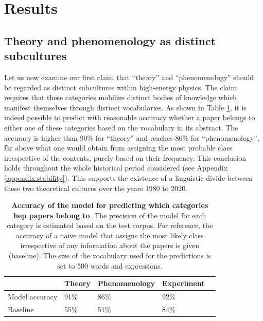 \documentclass[smallextended]{svjour3}
\begin{document}
\section{Results}
\label{section:application}

\subsection{Theory and phenomenology as distinct subcultures}\label{section:application_subcultures}

Let us now examine our first claim that ``theory'' and ``phenomenology''  should be regarded as distinct subcultures within high-energy physics. The claim requires that these categories mobilize distinct bodies of knowledge which manifest themselves through distinct vocabularies. As shown in Table \ref{table:categories_bow_prediction}, it is indeed possible to predict with reasonable accuracy whether a paper belongs to either one of these categories based on the vocabulary in its abstract. The accuracy is higher than 90\% for ``theory'' and reaches 86\% for ``phenomenology'', far above what one would obtain from assigning the most probable class irrespective of the contents, purely based on their frequency. This conclusion holds throughout the whole historical period considered (see Appendix \ref{appendix:stability}). This supports the existence of a linguistic divide between these two theoretical cultures over the years 1980 to 2020.

\begin{table}[h]
\centering
\begin{tabular}{@{}lllll@{}}
\toprule
               & Theory & Phenomenology & Experiment &  \\ \midrule
Model accuracy & 91\%   & 86\%          & 92\%       &  \\
Baseline       & 55\%   & 51\%          & 84\%       &  \\ \bottomrule
\end{tabular}
\caption{\textbf{Accuracy of the model for predicting which categories \gls{hep} papers belong to}. The precision of the model for each category is estimated based on the test corpus. For reference, the accuracy of a naive model that assigns the most likely class irrespective of any information about the papers is given (baseline). The size of the vocabulary used for the predictions is set to 500 words and expressions. }
    \label{table:categories_bow_prediction}
\end{table}
\end{document}
